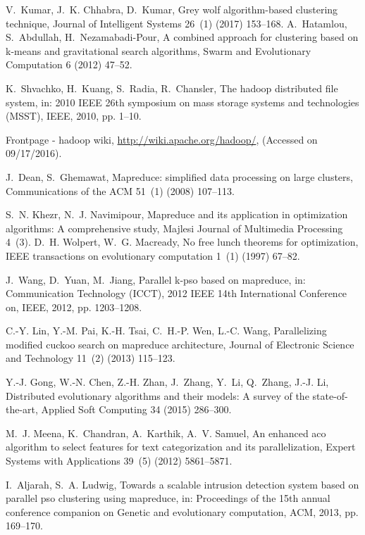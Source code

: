 \documentclass[review]{elsarticle}
\begin{document}
\begin{thebibliography}{10}
V.~Kumar, J.~K. Chhabra, D.~Kumar, Grey wolf algorithm-based clustering
  technique, Journal of Intelligent Systems 26~(1) (2017) 153--168.
A.~Hatamlou, S.~Abdullah, H.~Nezamabadi-Pour, A combined approach for
  clustering based on k-means and gravitational search algorithms, Swarm and
  Evolutionary Computation 6 (2012) 47--52.

K.~Shvachko, H.~Kuang, S.~Radia, R.~Chansler, The hadoop distributed file
  system, in: 2010 IEEE 26th symposium on mass storage systems and technologies
  (MSST), IEEE, 2010, pp. 1--10.

Frontpage - hadoop wiki, \url{http://wiki.apache.org/hadoop/}, (Accessed on
  09/17/2016).

J.~Dean, S.~Ghemawat, Mapreduce: simplified data processing on large clusters,
  Communications of the ACM 51~(1) (2008) 107--113.

S.~N. Khezr, N.~J. Navimipour, Mapreduce and its application in optimization
  algorithms: A comprehensive study, Majlesi Journal of Multimedia Processing
  4~(3).
D.~H. Wolpert, W.~G. Macready, No free lunch theorems for optimization, IEEE
  transactions on evolutionary computation 1~(1) (1997) 67--82.

J.~Wang, D.~Yuan, M.~Jiang, Parallel k-pso based on mapreduce, in:
  Communication Technology (ICCT), 2012 IEEE 14th International Conference on,
  IEEE, 2012, pp. 1203--1208.

C.-Y. Lin, Y.-M. Pai, K.-H. Tsai, C.~H.-P. Wen, L.-C. Wang, Parallelizing
  modified cuckoo search on mapreduce architecture, Journal of Electronic
  Science and Technology 11~(2) (2013) 115--123.

Y.-J. Gong, W.-N. Chen, Z.-H. Zhan, J.~Zhang, Y.~Li, Q.~Zhang, J.-J. Li,
  Distributed evolutionary algorithms and their models: A survey of the
  state-of-the-art, Applied Soft Computing 34 (2015) 286--300.

M.~J. Meena, K.~Chandran, A.~Karthik, A.~V. Samuel, An enhanced aco algorithm
  to select features for text categorization and its parallelization, Expert
  Systems with Applications 39~(5) (2012) 5861--5871.

I.~Aljarah, S.~A. Ludwig, Towards a scalable intrusion detection system based
  on parallel pso clustering using mapreduce, in: Proceedings of the 15th
  annual conference companion on Genetic and evolutionary computation, ACM,
  2013, pp. 169--170.


\end{thebibliography}
\end{document}
